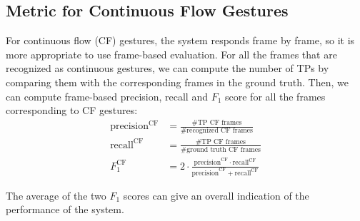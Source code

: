 \subsection{Metric for Continuous Flow Gestures}
For continuous flow (CF) gestures, the system responds frame by frame,
so it is more appropriate to use frame-based evaluation. For all the frames that are
recognized as continuous gestures, we can compute the number of TPs by
comparing them with the corresponding frames in the ground truth. Then, we can
compute frame-based precision, recall and $F_1$ score for all the frames
corresponding to CF gestures:
\begin{align}
\text{precision}^{\text{CF}} &=\frac{\text{\# TP CF frames}}{\text{\# recognized
CF frames}}
\\
\text{recall}^{\text{CF}} &=\frac{\text{\# TP CF frames}}{\text{\# ground truth
CF frames}}\\
F_1^{\text{CF}} &= 2\cdot \frac{\text{precision}^{\text{CF}} \cdot
\text{recall}^{\text{CF}}}{\text{precision}^{\text{CF}} +
\text{recall}^{\text{CF}}}
\end{align}


The average of the two $F_1$ scores can give an overall indication of the
performance of the system.
